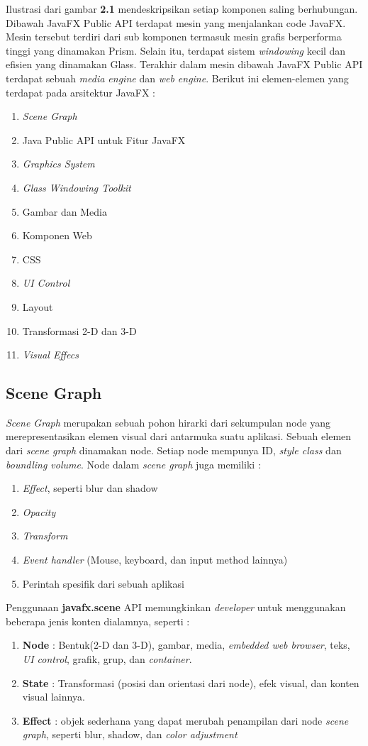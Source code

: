 Ilustrasi dari gambar \textbf{2.1} mendeskripsikan setiap komponen saling berhubungan. Dibawah JavaFX Public API terdapat mesin yang menjalankan code JavaFX. Mesin tersebut terdiri dari sub komponen termasuk mesin grafis berperforma tinggi yang dinamakan Prism. Selain itu, terdapat sistem \textit{windowing} kecil dan efisien yang dinamakan Glass. Terakhir dalam mesin dibawah JavaFX Public API terdapat sebuah \textit{media engine} dan \textit{web engine}. Berikut ini elemen-elemen yang terdapat pada arsitektur JavaFX : \cite{javafx}
\begin{enumerate}
	\item \textit{Scene Graph}
	\item Java Public API untuk Fitur JavaFX
	\item \textit{Graphics System}
	\item \textit{Glass Windowing Toolkit}
	\item Gambar dan Media
	\item Komponen Web
	\item CSS
	\item \textit{UI Control}
	\item Layout
	\item Transformasi 2-D dan 3-D
	\item \textit{Visual Effecs}
\end{enumerate}

\subsection{Scene Graph}
\label{subs:Scene_Graph}
\textit{Scene Graph} merupakan sebuah pohon hirarki dari sekumpulan node yang merepresentasikan elemen visual dari antarmuka suatu aplikasi. Sebuah elemen dari \textit{scene graph} dinamakan node. Setiap node mempunya ID, \textit{style class} dan \textit{boundling volume}. Node dalam \textit{scene graph} juga memiliki :\cite{javafx}
\begin{enumerate}
	\item \textit{Effect}, seperti blur dan shadow
	\item \textit{Opacity}
	\item \textit{Transform}
	\item \textit{Event handler} (Mouse, keyboard, dan input method lainnya)
	\item Perintah spesifik dari sebuah aplikasi
\end{enumerate} 

Penggunaan \textbf{javafx.scene} API memungkinkan \textit{developer} untuk menggunakan beberapa jenis konten dialamnya, seperti : \cite{javafx}
\begin{enumerate}
	\item \textbf{Node} : Bentuk(2-D dan 3-D), gambar, media, \textit{embedded web browser}, teks, \textit{UI control}, grafik, grup, dan \textit{container}.
	\item \textbf{State} : Transformasi (posisi dan orientasi dari node), efek visual, dan konten visual lainnya.
	\item \textbf{Effect} : objek sederhana yang dapat merubah penampilan dari node \textit{scene graph}, seperti blur, shadow, dan \textit{color adjustment}
\end{enumerate}

